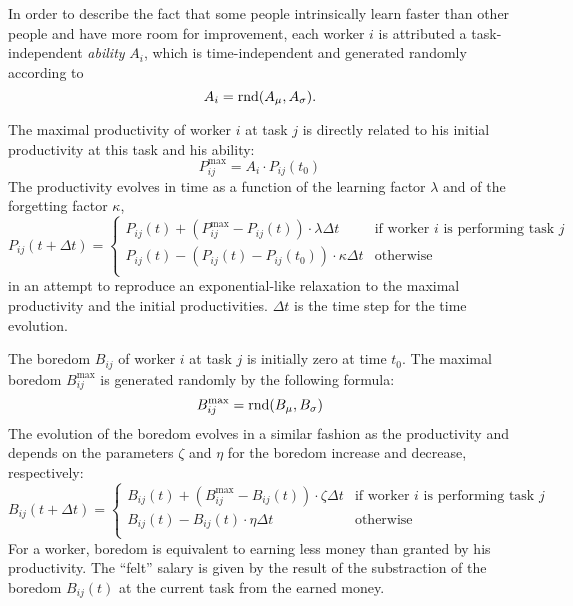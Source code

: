 In order to describe the fact that some people intrinsically learn faster than other people and have more room for improvement, each worker $i$ is attributed a task-independent \emph{ability} $A_i$, which is time-independent and generated randomly according to
\begin{equation}
	A_{i} = \mathrm{rnd}(A_\mu,A_\sigma).
\end{equation}

The maximal productivity of worker $i$ at task $j$ is directly related to his initial productivity at this task and his ability:
\begin{equation}
	P_{ij}^\textrm{max} = A_i \cdot P_{ij}(t_0)
\end{equation}
The productivity evolves in time as a function of the learning factor $\lambda$ and of the forgetting factor $\kappa$, 
\begin{equation}
	P_{ij}(t+\Delta t) = \begin{cases}
		P_{ij}(t) + (P_{ij}^\textrm{max}-P_{ij}(t)) \cdot \lambda \Delta t & \text{if worker $i$ is performing task $j$}\\
		P_{ij}(t) - (P_{ij}(t)-P_{ij}(t_0)) \cdot \kappa \Delta t & \text{otherwise}\\
		\end{cases}
\end{equation}
in an attempt to reproduce an exponential-like relaxation to the maximal productivity and the initial productivities. $\Delta t$ is the time step for the time evolution.

The boredom $B_{ij}$ of worker $i$ at task $j$ is initially zero at time $t_0$. The maximal boredom $B_{ij}^\textrm{max}$ is generated randomly by the following formula:
\begin{equation}
	B_{ij}^\textrm{max} = \mathrm{rnd}(B_\mu,B_\sigma)
\end{equation}
The evolution of the boredom evolves in a similar fashion as the productivity and depends on the parameters $\zeta$ and $\eta$ for the boredom increase and decrease, respectively:
\begin{equation}
	B_{ij}(t+\Delta t) = \begin{cases}
		B_{ij}(t) + (B_{ij}^\textrm{max}-B_{ij}(t)) \cdot \zeta \Delta t & \text{if worker $i$ is performing task $j$}\\
		B_{ij}(t) - B_{ij}(t) \cdot \eta \Delta t & \text{otherwise}\\
		\end{cases}
\end{equation}
For a worker, boredom is equivalent to earning less money than granted by his productivity. The ``felt'' salary is given by the result of the substraction of the boredom $B_{ij}(t)$ at the current task from the earned money.


